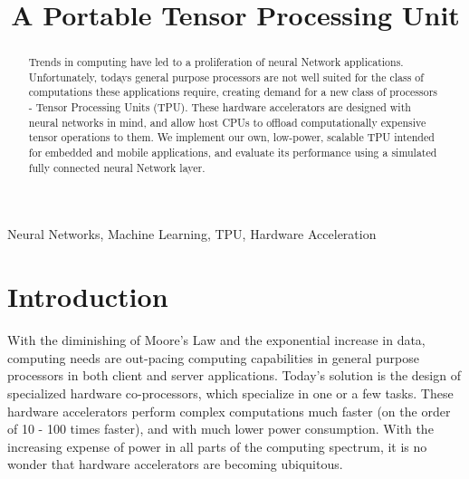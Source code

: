 \documentclass[11pt, conference, onecolumn]{IEEEtran}
\begin{document}
\title{A Portable Tensor Processing Unit\\
}

\author{
\and
{}
\and
{}
\and
{}
}

\maketitle


\begin{abstract}
    Trends in computing have led to a proliferation of neural Network applications.
    Unfortunately, todays general purpose processors are not well suited for the class of
    computations these applications require, creating demand for a new class of processors
    - Tensor Processing Units (TPU). These hardware accelerators are designed with neural
    networks in mind, and allow host CPUs to offload computationally expensive
    tensor operations to them. We implement our own, low-power, scalable TPU intended for
    embedded and mobile applications, and evaluate its performance using a simulated
    fully connected neural Network layer.
\end{abstract}

\begin{IEEEkeywords}
Neural Networks, Machine Learning, TPU, Hardware Acceleration
\end{IEEEkeywords}

\section{Introduction}
    With the diminishing of Moore's Law and the exponential increase in data, computing
    needs are out-pacing computing capabilities in general purpose processors in both
    client and server applications. Today's solution is the design of specialized hardware
    co-processors, which specialize in one or a few tasks. These hardware accelerators
    perform complex computations much faster (on the order of 10 - 100 times faster), and
    with much lower power consumption. With the increasing expense of power in all parts
    of the computing spectrum, it is no wonder that hardware accelerators are becoming
    ubiquitous.
\end{document}
